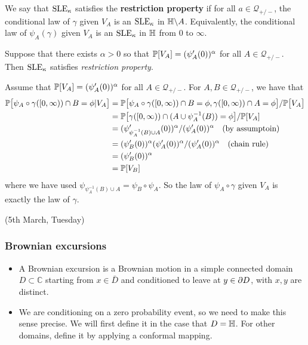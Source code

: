 \documentclass[12pt,a4paper]{article}
\newenvironment{proof}
{\begin{changemargin}{0.5cm}{0.5cm} 
	}%
	{\end{changemargin}
}
\newenvironment{p}
{\begin{proof} 
	}%
	{\end{proof}
}
\begin{document}
 We say that $\text{SLE}_{\kappa}$ satisfies the \textbf{restriction property} if for all $a\in \mathscr{Q}_{+/-}$, the conditional law of $\gamma$ given $V_A$ is an $\text{SLE}_{\kappa}$ in $\mathbb{H} \backslash A$. Equivalently, the conditional law of $\psi_A(\gamma)$ given $V_A$ is an $\text{SLE}_{\kappa}$ in $\mathbb{H}$ from 0 to $\infty$. 
\s

\lem Suppose that there exists $\alpha >0$ so that $\mathbb{P}[V_A] = (\psi'_A(0))^{\alpha}$ for all $A\in \mathscr{Q}_{+/-}$. Then $\text{SLE}_{\kappa}$ satisfies \emph{restriction property}. 
\begin{p}
\pf Assume that $\mathbb{P}[V_A] = (\psi'_A(0))^{\alpha}$ for all $A\in \mathscr{Q}_{+/-}$. For $A, B\in \mathscr{Q}_{+/-}$, we have that
\begin{align*}
\mathbb{P} \big[\psi_A \circ \gamma([0,\infty)) \cap B = \phi | V_A \big] &= \mathbb{P} \big[\psi_A \circ \gamma([0,\infty)) \cap B = \phi, \gamma([0, \infty)) \cap A = \phi \big] / \mathbb{P} \big[V_A\big] \\
&= \mathbb{P} \big[\gamma([0, \infty))\cap (A\cup \psi_{A}^{-1}(B)) = \phi \big] / \mathbb{P}[V_A] \\
&= (\psi'_{\psi^{-1}_A (B) \cup A}(0))^{\alpha} / (\psi'_A(0))^{\alpha} \quad \text{(by assumptoin)} \\
&= (\psi'_B(0))^{\alpha}(\psi'_A(0))^{\alpha} / (\psi'_A(0))^{\alpha} \quad \text{(chain rule)} \\
&= (\psi'_B(0))^{\alpha} \\
&= \mathbb{P}[V_B]
\end{align*}
where we have used $\psi_{\psi_A^{-1}(B) \cup A} = \psi_B \circ \psi_A$. So the law of $\psi_A \circ \gamma$ given $V_A$ is exactly the law of $\gamma$.

\eop
\end{p}
\s

\newday

(5th March, Tuesday)
\s

\subsubsection*{Brownian excursions}
\begin{itemize}
\item A Brownian excursion is a Brownian motion in a simple connected domain $D\subset \mathbb{C}$ starting from $x\in \bar{D}$ and conditioned to leave at $y\in \partial D$, with $x,y$ are distinct.
\item We are conditioning on a zero probability event, so we need to make this sense precise. We will first define it in the case that $D= \mathbb{H}$. For other domains, define it by applying a conformal mapping.
\end{itemize}
\s
\end{document}
